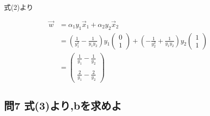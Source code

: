 \documentclass[dvipdfmx,autodetect-engine,titlepage]{jsarticle}
\begin{document}
式(2)より

\begin{align*}
  \overrightarrow{w} &= \alpha_1 y_1 \overrightarrow{x}_1 + \alpha_2 y_2 \overrightarrow{x}_2\\
  &= (\frac{1}{y_1^2} - \frac{1}{y_1 y_2}) y_1   
  \begin{pmatrix}
    0 \\
    1  
  \end{pmatrix}
  +
  (-\frac{1}{y_2^2} + \frac{1}{y_1 y_2}) y_2 
  \begin{pmatrix}
    1 \\
    1  
  \end{pmatrix}\\
  &= 
  \begin{pmatrix}
    \frac{1}{y_1} - \frac{1}{y_2} \\\\
    \frac{2}{y_1} - \frac{2}{y_2}
  \end{pmatrix}
\end{align*}

\subsection*{問7 式(3)より,bを求めよ}
\end{document}

